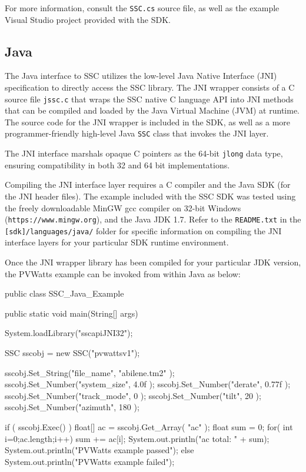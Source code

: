 \documentclass{scrartcl} %
\begin{document}
For more information, consult the \texttt{SSC.cs} source file, as well as the example Visual Studio project provided with the SDK.

\subsection{Java}

The Java interface to SSC utilizes the low-level Java Native Interface (JNI) specification to directly access the SSC library.  The JNI wrapper consists of a C source file \texttt{jssc.c} that wraps the SSC native C language API into JNI methods that can be compiled and loaded by the Java Virtual Machine (JVM) at runtime.  The source code for the JNI wrapper is included in the SDK, as well as a more programmer-friendly high-level Java \texttt{SSC} class that invokes the JNI layer.

The JNI interface marshals opaque C pointers as the 64-bit \texttt{jlong} data type, ensuring compatibility in both 32 and 64 bit implementations.

Compiling the JNI interface layer requires a C compiler and the Java SDK (for the JNI header files).  The example included with the SSC SDK was tested using the freely downloadable MinGW gcc compiler on 32-bit Windows (\texttt{https://www.mingw.org}), and the Java JDK 1.7.  Refer to the \texttt{README.txt} in the \texttt{[sdk]/languages/java/} folder for specific information on compiling the JNI interface layers for your particular SDK runtime environment.

Once the JNI wrapper library has been compiled for your particular JDK version, the PVWatts example can be invoked from within Java as below:

\begin{verbatimtab}[4]

public class SSC_Java_Example {
   
    public static void main(String[] args)
    {
        System.loadLibrary("sscapiJNI32");
		
        SSC sscobj = new SSC("pvwattsv1");

        sscobj.Set_String("file_name", "abilene.tm2" );
        sscobj.Set_Number("system_size", 4.0f );
        sscobj.Set_Number("derate", 0.77f );
        sscobj.Set_Number("track_mode", 0 );
        sscobj.Set_Number("tilt", 20 );
        sscobj.Set_Number("azimuth", 180 );
        
		if ( sscobj.Exec() )
        {
            float[] ac = sscobj.Get_Array( "ac" );
            float sum = 0;
            for( int i=0;ac.length;i++)
            {
                sum += ac[i];
            }
            System.out.println("ac total: " + sum);
            System.out.println("PVWatts example passed");
        }
        else
        {
            System.out.println("PVWatts example failed");
        }
    }    
}

\end{verbatimtab}
\end{document}
